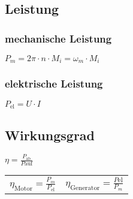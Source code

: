 \begin{sectionbox}
\subsection{Leistung}
\subsubsection{mechanische Leistung}
\begin{emphbox}
  $P_m = 2\pi\cdot n\cdot M_i = \omega_m\cdot M_i$
\end{emphbox}

\subsubsection{elektrische Leistung}
\begin{emphbox}
  $P_\text{el} = U\cdot I$
\end{emphbox}

\subsection{Wirkungsgrad}
\begin{emphbox}
  $\eta = \frac{P_\text{ab}}{P\text{auf}}$
\end{emphbox}
\begin{tabularx}{\columnwidth}{CC}
$\eta_\text{Motor} = \frac{P_m}{P_\text{el}}$ & $\eta_\text{Generator} = \frac{P\text{el}}{P_m}$
\end{tabularx}
\end{sectionbox}
